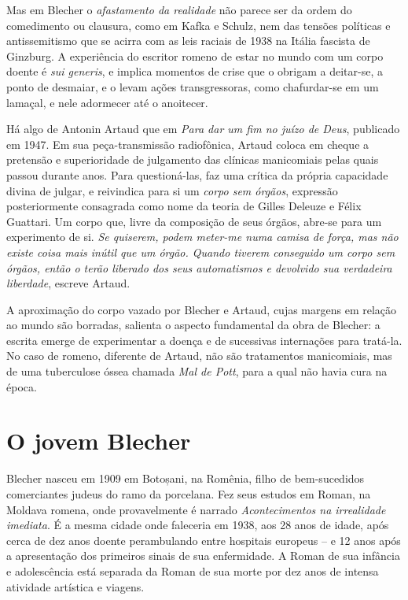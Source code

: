 Mas em Blecher o \textit{afastamento da realidade} não parece ser da ordem do comedimento ou clausura, como em Kafka e Schulz, nem das tensões políticas e  antissemitismo que se acirra com as leis raciais de 1938 na Itália fascista de Ginzburg. A experiência do escritor romeno de estar no mundo com um corpo doente é \textit{sui generis}, e implica momentos de crise que o obrigam a deitar-se, a ponto de desmaiar, e o levam ações transgressoras, como chafurdar-se em um lamaçal, e nele adormecer até o anoitecer.

Há algo de Antonin Artaud que em \textit{Para dar um fim no juízo de Deus}, publicado em 1947. Em sua peça-transmissão radiofônica, Artaud coloca em cheque a pretensão e superioridade de julgamento das clínicas manicomiais pelas quais passou durante anos. Para questioná-las, faz uma crítica da própria capacidade divina de julgar, e reivindica para si um \textit{corpo sem órgãos}, expressão posteriormente consagrada como nome da teoria de Gilles Deleuze e Félix Guattari. Um corpo que, livre da composição de seus órgãos, abre-se para um experimento de si. \textit{Se quiserem, podem meter-me numa camisa de força, mas não existe coisa mais inútil que um órgão. Quando tiverem conseguido um corpo sem órgãos, então o terão liberado dos seus automatismos e devolvido sua verdadeira liberdade}, escreve Artaud.

A aproximação do corpo vazado por Blecher e Artaud, cujas margens em relação ao mundo são borradas, salienta o aspecto fundamental da obra de Blecher: a escrita emerge de experimentar a doença e de sucessivas internações para tratá-la. No caso de romeno, diferente de Artaud, não são tratamentos manicomiais, mas de uma tuberculose óssea chamada \textit{Mal de Pott}, para a qual não havia cura na época.

\section{O jovem Blecher}

Blecher nasceu em 1909 em Botoșani, na Romênia, filho de bem-sucedidos comerciantes judeus do ramo da porcelana. Fez seus estudos em Roman, na Moldava romena, onde provavelmente é narrado \textit{Acontecimentos na irrealidade imediata}. É a mesma cidade onde faleceria em 1938, aos 28 anos de idade, após cerca de dez anos doente perambulando entre hospitais europeus -- e 12 anos após a apresentação dos primeiros sinais de sua enfermidade. A Roman de sua infância e adolescência está separada da Roman de sua morte por dez anos de intensa atividade artística e viagens.

